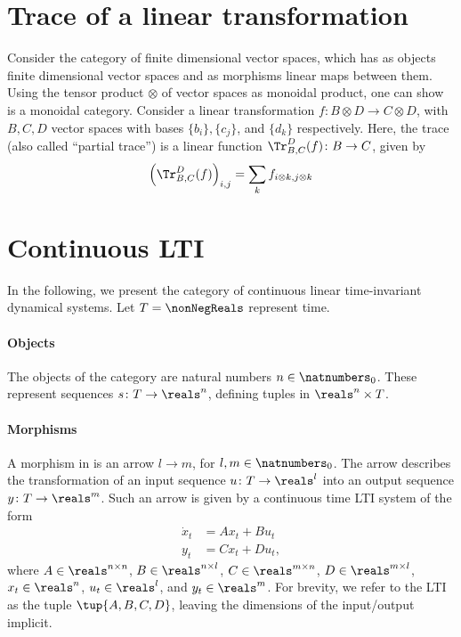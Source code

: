 

\section{Trace of a linear transformation}
Consider the category \FinVect of finite dimensional vector spaces, which has as objects finite dimensional vector spaces and as morphisms linear maps between them. Using the tensor product $\otimes$ of vector spaces as monoidal product, one can show \FinVect is a monoidal category. Consider a linear transformation $f\colon B\otimes D\to C\otimes D$, with $B,C,D$ vector spaces with bases $\{b_i\},\{c_j\}$, and $\{d_k\}$ respectively. Here, the trace (also called ``partial trace'') is a linear function $\Tr_{B,C}
^D(f)\colon B\to C$, given by
\begin{equation}
    \left(\Tr_{B,C}
    ^D(f) \right)_{i,j}=\sum_{k}f_{i\otimes k,j\otimes k}
\end{equation}



\section{Continuous LTI}
In the following, we present the category of continuous linear time-invariant dynamical systems. Let $T=\nonNegReals$ represent time.

\paragraph{Objects} The objects of the category are natural numbers $n\in \natnumbers_0$. These represent sequences $s\colon T\to \reals^n$, defining tuples in $\reals^n\times T$.

\paragraph{Morphisms} A morphism in \LTI is an arrow $l\to m$, for $l,m\in \natnumbers_0$. The arrow describes the transformation of an input sequence $u\colon T\to \reals^l$ into an output sequence $y\colon T\to \reals^m$. Such an arrow is given by a continuous time LTI system of the form
\begin{equation}
    \begin{aligned}
        \dot{x}_t&=A x_t+B u_t\\
        y_t&=C x_t +D u_t,
    \end{aligned}
\end{equation}
where $A\in \reals^{n\times n}$, $B\in \reals^{n\times l}$, $C\in \reals^{m\times n}$, $D\in \reals^{m\times l}$, $x_t\in \reals^n$, $u_t\in \reals^l$, and $y_t\in \reals^m$. For brevity, we refer to the LTI as the tuple $\tup{A,B,C,D}$, leaving the dimensions of the input/output implicit.

